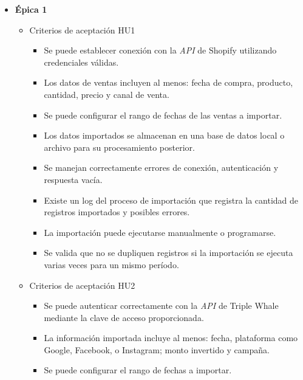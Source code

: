 \documentclass[
11pt, %
]{charter}
\begin{document}
\begin{itemize}
  \item \textbf{\'{E}pica 1}
    \begin{itemize}
    
      \item Criterios de aceptación HU1
		\begin{itemize}
      \item Se puede establecer conexión con la \textit{API} de Shopify utilizando credenciales válidas.

      \item Los datos de ventas incluyen al menos: fecha de compra, producto, cantidad, precio y canal de venta.

      \item Se puede configurar el rango de fechas de las ventas a importar.

      \item Los datos importados se almacenan en una base de datos local o archivo para su procesamiento posterior.

      \item Se manejan correctamente errores de conexión, autenticación y respuesta vacía.

      \item Existe un log del proceso de importación que registra la cantidad de registros importados y posibles errores.

      \item La importación puede ejecutarse manualmente o programarse.      
      
      \item Se valida que no se dupliquen registros si la importación se ejecuta varias veces para un mismo período.      
    \end{itemize}  
        
      \item Criterios de aceptación HU2
		\begin{itemize}
      \item Se puede autenticar correctamente con la \textit{API} de Triple Whale mediante la clave de acceso proporcionada.

      \item La información importada incluye al menos: fecha, plataforma como Google, Facebook, o Instagram; monto invertido y campaña.

      \item Se puede configurar el rango de fechas a importar.


\end{itemize}
\end{itemize}
\end{itemize}
\end{document}
